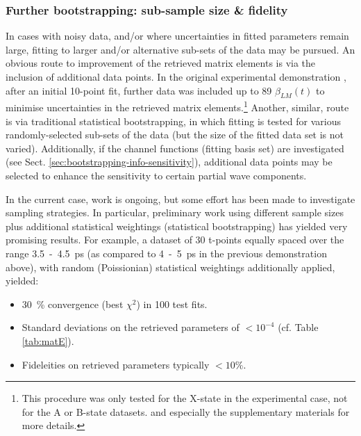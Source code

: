 \documentclass[10pt]{article}
\begin{document}


\subsubsection{Further bootstrapping: sub-sample size \& fidelity}

In cases with noisy data, and/or where uncertainties in fitted parameters remain large, fitting to larger and/or alternative sub-sets of the data may be pursued.
An obvious route to improvement of the retrieved matrix elements is via the inclusion of additional data points. In the original experimental demonstration \cite{marceau2017MolecularFrameReconstruction}, after an initial 10-point fit, further data was included up to 89 $\beta_{LM}(t)$ to minimise uncertainties in the retrieved matrix elements.\footnote{This procedure was only tested for the X-state in the experimental case, not for the A or B-state datasets. %
and especially the supplementary materials for more details.} Another, similar, route is via traditional statistical bootstrapping, in which fitting is tested for various randomly-selected sub-sets of the data (but the size of the fitted data set is not varied). Additionally, if the channel functions (fitting basis set) are investigated (see Sect. \ref{sec:bootstrapping-info-sensitivity}), additional data points may be selected to enhance the sensitivity to certain partial wave components.

In the current case, work is ongoing, %
but some effort has been made to investigate sampling strategies. In particular, preliminary work using different sample sizes plus additional statistical weightings (statistical bootstrapping) has yielded very promising results. For example, a dataset of 30 t-points equally spaced over the range 3.5~-~4.5~ps (as compared to 4~-~5~ps in the previous demonstration above), with random (Poissionian) statistical weightings additionally applied, yielded:

\begin{itemize}
\item 30~\% convergence (best $\chi^2$) in 100 test fits.
\item Standard deviations on the retrieved parameters of $<10^{-4}$ (cf. Table \ref{tab:matE}).
\item Fideleities on retrieved parameters typically $<10\%$.
\end{itemize}
\end{document}

